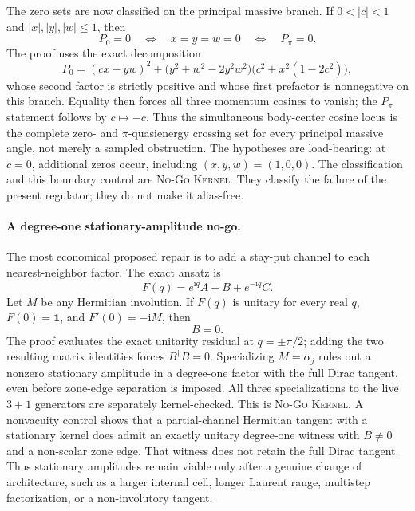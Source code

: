 \documentclass[11pt]{article}
\newcommand{\Kernel}{\textcolor{kernelcolor}{\textsc{Kernel}}}
\newcommand{\NoGo}{\textsc{No-Go}}
\newcommand{\ii}{\mathrm{i}}
\newcommand{\id}{\mathbf{1}}
\begin{document}
The zero sets are now classified on the principal massive branch.  If
$0<|c|<1$ and $|x|,|y|,|w|\leq1$, then
\begin{equation}\label{eq:fullblochzeroset}
 P_0=0 \quad\Longleftrightarrow\quad x=y=w=0
 \quad\Longleftrightarrow\quad P_\pi=0.
\end{equation}
The proof uses the exact decomposition
\begin{equation}
 P_0=(cx-yw)^2+
 \bigl(y^2+w^2-2y^2w^2\bigr)
 \bigl(c^2+x^2(1-2c^2)\bigr),
\end{equation}
whose second factor is strictly positive and whose first prefactor is
nonnegative on this branch.  Equality then forces all three momentum cosines
to vanish; the $P_\pi$ statement follows by $c\mapsto-c$.  Thus the simultaneous
body-center cosine locus is the complete zero- and $\pi$-quasienergy crossing
set for every principal massive angle, not merely a sampled obstruction.
The hypotheses are load-bearing: at $c=0$, additional zeros occur, including
$(x,y,w)=(1,0,0)$.  The classification and this boundary control are
\NoGo{} \Kernel{}.  They classify the failure of the present regulator; they
do not make it alias-free.

\paragraph{A degree-one stationary-amplitude no-go.}
The most economical proposed repair is to add a stay-put channel to each
nearest-neighbor factor.  The exact ansatz is
\begin{equation}\label{eq:stationarylaurent}
 F(q)=e^{\ii q}A+B+e^{-\ii q}C.
\end{equation}
Let $M$ be any Hermitian involution.  If $F(q)$ is unitary for every real $q$,
$F(0)=\id$, and $F'(0)=-\ii M$, then
\begin{equation}\label{eq:stationarynogo}
 B=0.
\end{equation}
The proof evaluates the exact unitarity residual at $q=\pm\pi/2$; adding the
two resulting matrix identities forces $B^\dagger B=0$.  Specializing
$M=\alpha_j$ rules out a nonzero stationary amplitude in a degree-one factor
with the full Dirac tangent, even before zone-edge separation is imposed.
All three specializations to the live $3+1$ generators are separately
kernel-checked.  This is \NoGo{} \Kernel{}.  A nonvacuity control shows that a partial-channel
Hermitian tangent with a stationary kernel does admit an exactly unitary
degree-one witness with $B\neq0$ and a non-scalar zone edge.  That witness does
not retain the full Dirac tangent.  Thus stationary amplitudes remain viable
only after a genuine change of architecture, such as a larger internal cell,
longer Laurent range, multistep factorization, or a non-involutory tangent.
\end{document}
